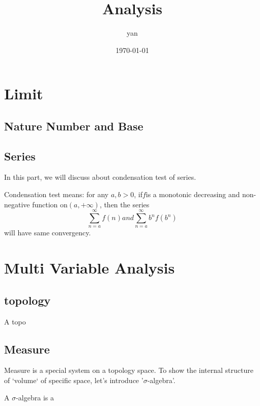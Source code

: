 \documentclass{book}
\title{Analysis}
\author{yan}
\date{\today}
\begin{document}
\frontmatter
\maketitle
\tableofcontents

\mainmatter
\part{Limit}
\chapter{Nature Number and Base}
\chapter{Series}

In this part, we will discuss about condensation test of series.

Condensation test means: for any $a, b > 0$, if$f$is a monotonic decreasing and non-negative function on$(a,+\infty)$, then the series
\begin{equation}
\sum_{n=a}^{\infty} f(n) and \sum_{n=a}^{\infty} b^nf(b^n)
\end{equation}
will have same convergency.

\part{Multi Variable Analysis}
\chapter{topology}
A topo


\chapter{Measure}
Measure is a special system on a topology space.
To show the internal structure of `volume` of specific space, let's introduce '$\sigma$-algebra'.


A $\sigma$-algebra is a 
\end{document}
